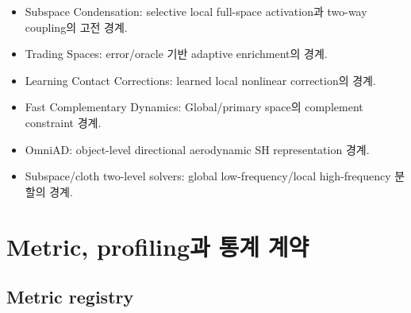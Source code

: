 \documentclass[10pt,a4paper]{article}
\begin{document}
\begin{itemize}
  \item Subspace Condensation: selective local full-space activation과 two-way coupling의 고전 경계.
  \item Trading Spaces: error/oracle 기반 adaptive enrichment의 경계.
  \item Learning Contact Corrections: learned local nonlinear correction의 경계.
  \item Fast Complementary Dynamics: Global/primary space의 complement constraint 경계.
  \item OmniAD: object-level directional aerodynamic SH representation 경계.
  \item Subspace/cloth two-level solvers: global low-frequency/local high-frequency 분할의 경계.
\end{itemize}

\section{Metric, profiling과 통계 계약}

\subsection{Metric registry}
\end{document}
